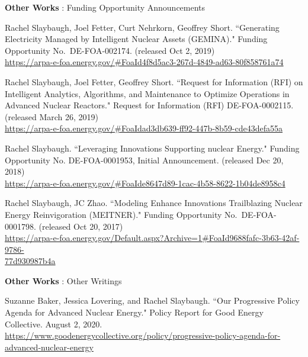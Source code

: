 \begin{bibsection}
\item \textbf{Other Works} : Funding Opportunity Announcements
\item Rachel Slaybaugh, Joel Fetter, Curt Nehrkorn, Geoffrey Short. ``Generating Electricity Managed by Intelligent Nuclear
Assets (GEMINA)." Funding Opportunity No.\ DE-FOA-002174. (released Oct 2, 2019)\\
\url{https://arpa-e-foa.energy.gov/#FoaId4f8d5ac3-267d-4849-ad63-80f858761a74}

\item Rachel Slaybaugh, Joel Fetter, Geoffrey Short. ``Request for Information (RFI) on Intelligent Analytics, Algorithms, and Maintenance to Optimize Operations in Advanced Nuclear Reactors." Request for Information (RFI) DE-FOA-0002115. (released March 26, 2019)\\
\url{https://arpa-e-foa.energy.gov/#FoaIdad3db639-ff92-447b-8b59-cde43defa55a}

\item Rachel Slaybaugh. ``Leveraging Innovations Supporting nuclear Energy." Funding Opportunity No. DE-FOA-0001953, Initial Announcement. (released Dec 20, 2018)\\
\url{https://arpa-e-foa.energy.gov/#FoaIde8647d89-1cac-4b58-8622-1b04de8958c4}

\item Rachel Slaybaugh, JC Zhao. ``Modeling Enhance Innovations Trailblazing Nuclear Energy Reinvigoration (MEITNER)." Funding Opportunity No.\ DE-FOA-0001798. (released Oct 20, 2017)\\
\url{https://arpa-e-foa.energy.gov/Default.aspx?Archive=1#FoaId9688fafc-3b63-42af-9786-}\\ \url{77d930987b4a}

\item \textbf{Other Works} : Other Writings
\item Suzanne Baker, Jessica Lovering, and Rachel Slaybaugh. ``Our Progressive Policy Agenda for Advanced Nuclear Energy." Policy Report for Good Energy Collective. August 2, 2020. \url{https://www.goodenergycollective.org/policy/progressive-policy-agenda-for-advanced-nuclear-energy}



\end{bibsection}

